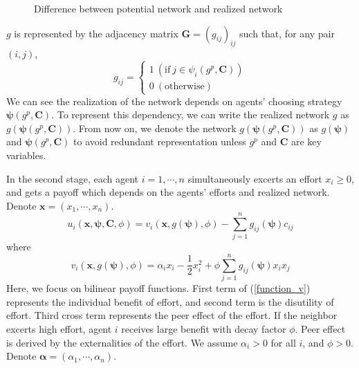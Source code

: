 \documentclass[12pt]{article}
\theoremstyle{definition}
\begin{document}
\begin{figure}[h]
\caption{Difference between potential network and realized network} \label{fig:dif}
\end{figure}

$g$ is represented by the adjacency matrix $\bm{G} = {(g_{ij})}_{ij}$ such that, for any pair $(i,j)$,
\[ g_{ij} = 
	\begin{cases}
		1 \  (\text{if} \  j \in \psi_i(g^p, {\bm{C}}) ) \\
		0 \  (\text{otherwise})
	\end{cases} \]
We can see the realization of the network depends on agents' choosing strategy $\bm{\psi}(g^p, \bm{C})$.
To represent this dependency, we can write the realized network $g$ as $g(\bm{\psi}(g^p, \bm{C}))$.
From now on, we denote the network $g(\bm{\psi}(g^p, \bm{C}))$ as $g(\bm{\psi})$ and $\bm{\psi}(g^p, \bm{C})$ to avoid redundant representation unless $g^p$ and $\bm{C}$ are key variables.

In the second stage, each agent $i = 1, \cdots, n$ simultaneously excerts an effort $x_i \ge 0$, and gets a payoff which depends on the agents' efforts and realized network.
Denote $\bm{x} = (x_1, \cdots, x_n)$.
\[ u_i(\bm{x}, \bm{\psi}, \bm{C}, \phi) = v_i(\bm{x}, g(\bm{\psi}), \phi) - \sum_{j=1}^n g_{ij}(\bm{\psi}) c_{ij} \]
where
\begin{equation}
\label{function_v}
	v_i(\bm{x}, g(\bm{\psi}), \phi) = \alpha_i x_i - \frac{1}{2} x_i^2 + \phi \sum_{j=1}^n g_{ij}(\bm{\psi}) x_i x_j
\end{equation}
Here, we focus on bilinear payoff functions.
First term of (\ref{function_v}) represents the individual benefit of effort, and second term is the disutility of effort.
Third cross term represents the peer effect of the effort.
If the neighbor excerts high effort, agent $i$ receives large benefit with decay factor $\phi$.
Peer effect is derived by the externalities of the effort.
We assume $\alpha_i > 0$ for all $i$, and $\phi > 0$.
Denote $\bm{\alpha} = (\alpha_1, \cdots, \alpha_n)$.
\end{document}
